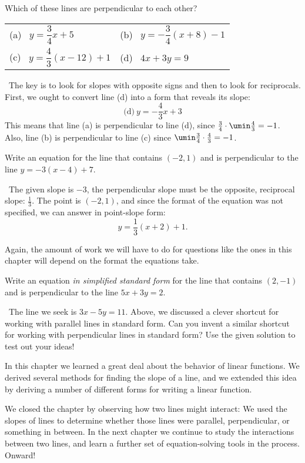\begin{boxex}
Which of these lines are perpendicular to each other?

\begin{center}
\begin{tabularx}{0.8\linewidth}{XX}
(a)~ $y=\dfrac{3}{4}x+5$
&
(b)~ $y=-\dfrac{3}{4}(x+8)-1$
\\[3ex]
(c)~ $y=\dfrac{4}{3}(x-12)+1$
&
(d)~ $4x+3y=9$
\end{tabularx}
\end{center}

\exsoln\ The key is to look for slopes with opposite signs and then to look for reciprocals. First, we ought to convert line (d) into a form that reveals its slope: \[\text{(d)}~y=-\frac{4}{3}x + 3\] This means that line (a) is perpendicular to line (d), since $\frac{3}{4}\cdot\umin\frac{4}{3}=-1$. Also, line (b) is perpendicular to line (c) since $\umin\frac{3}{4}\cdot\frac{4}{3}=-1$.
\end{boxex}

\begin{boxex}
Write an equation for the line that contains $(-2,1)$ and is perpendicular to the line $y=-3(x-4) + 7$.

\exsoln\ The given slope is $-3$, the perpendicular slope must be the opposite, reciprocal slope: $\frac{1}{3}$. The point is $(-2,1)$, and since the format of the equation was not specified, we can answer in point-slope form: \[y = \frac{1}{3}(x+2)+1.\]
\end{boxex}

Again, the amount of work we will have to do for questions like the ones in this chapter will depend on the format the equations take.

\begin{boxex}
Write an equation \textit{in simplified standard form} for the line that contains $(2,-1)$ and is perpendicular to the line $5x+3y=2$.

\expsoln\ The line we seek is $3x-5y=11$. Above, we discussed a clever shortcut for working with parallel lines in standard form. Can you invent a similar shortcut for working with perpendicular lines in standard form? Use the given solution to test out your ideas!
%
\end{boxex}

\chaptersummary

In this chapter we learned a great deal about the behavior of linear functions. We derived several methods for finding the slope of a line, and we extended this idea by deriving a number of different forms for writing a linear function.

We closed the chapter by observing how two lines might interact: We used the slopes of lines to determine whether those lines were parallel, perpendicular, or something in between. In the next chapter we continue to study the interactions between two lines, and learn a further set of equation-solving tools in the process. Onward!

\chaptercopyright
